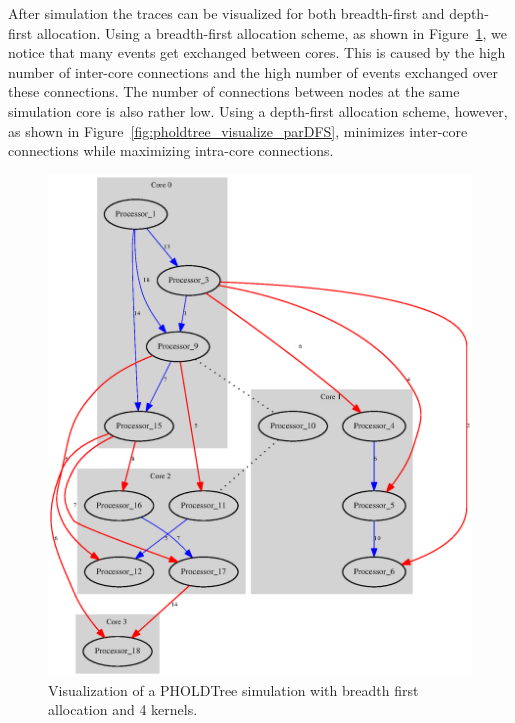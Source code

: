 After simulation the traces can be visualized for both breadth-first and depth-first allocation.
Using a breadth-first allocation scheme, as shown in Figure~\ref{fig:pholdtree_visualize_parBFS}, we notice that many events get exchanged between cores.
This is caused by the high number of inter-core connections and the high number of events exchanged over these connections.
The number of connections between nodes at the same simulation core is also rather low.
Using a depth-first allocation scheme, however, as shown in Figure~\ref{fig:pholdtree_visualize_parDFS}, minimizes inter-core connections while maximizing intra-core connections.

\begin{figure}
    \center
    \includegraphics[width=\columnwidth]{fig/pholdtreed1n3t5000c4BFS.eps}
    \caption{Visualization of a PHOLDTree simulation with breadth first allocation and 4 kernels.}
    \label{fig:pholdtree_visualize_parBFS}
\end{figure}
